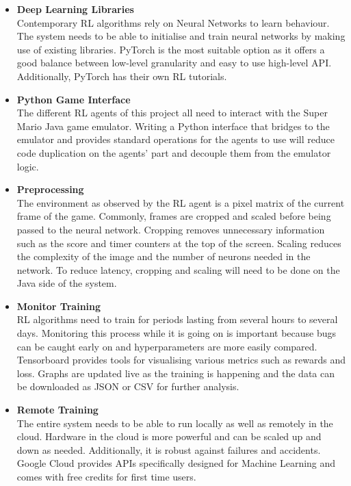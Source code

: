 \documentclass[notitlepage,a4paper,11pt]{article}
\begin{document}
\begin{itemize}
	\item \textbf{Deep Learning Libraries}\\
	Contemporary RL algorithms rely on Neural Networks to learn behaviour. The system needs to be able to initialise and train neural networks by making use of existing libraries. PyTorch is the most suitable option as it offers a good balance between low-level granularity and easy to use high-level API. Additionally, PyTorch has their own RL tutorials.
	
	\item \textbf{Python Game Interface}\\
	The different RL agents of this project all need to interact with the Super Mario Java game emulator. Writing a Python interface that bridges to the emulator and provides standard operations for the agents to use will reduce code duplication on the agents' part and decouple them from the emulator logic.
	
	\item \textbf{Preprocessing}\\
	The environment as observed by the RL agent is a pixel matrix of the current frame of the game. Commonly, frames are cropped and scaled before being passed to the neural network. Cropping removes unnecessary information such as the score and timer counters at the top of the screen. Scaling reduces the complexity of the image and the number of neurons needed in the network. To reduce latency, cropping and scaling will need to be done on the Java side of the system.
	
	\item \textbf{Monitor Training}\\
	RL algorithms need to train for periods lasting from several hours to several days. Monitoring this process while it is going on is important because bugs can be caught early on and hyperparameters are more easily compared. Tensorboard provides tools for visualising various metrics such as rewards and loss. Graphs are updated live as the training is happening and the data can be downloaded as JSON or CSV for further analysis.
	
	\item \textbf{Remote Training}\\
	The entire system needs to be able to run locally as well as remotely in the cloud. Hardware in the cloud is more powerful and can be scaled up and down as needed. Additionally, it is robust against failures and accidents. Google Cloud provides APIs specifically designed for Machine Learning and comes with free credits for first time users.
	
\end{itemize}
\end{document}
